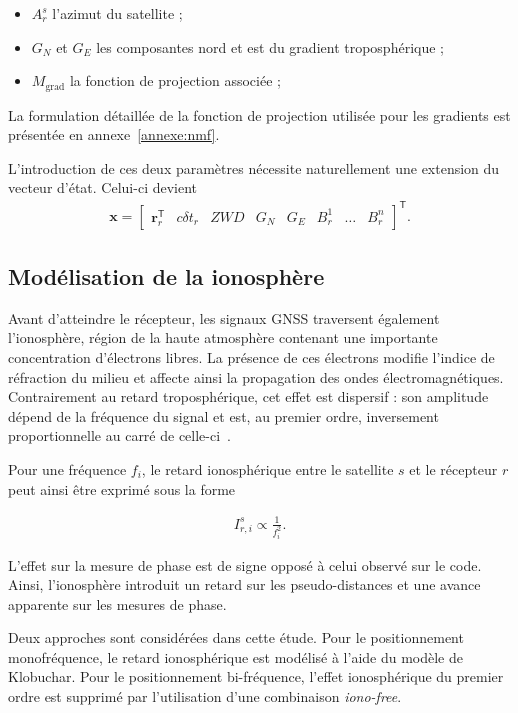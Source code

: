 \begin{itemize}
    \item $A_r^s$ l'azimut du satellite ;
    \item $G_N$ et $G_E$ les composantes nord et est du gradient
    troposphérique ;
    \item $M_{\mathrm{grad}}$ la fonction de projection associée ;
\end{itemize}

La formulation détaillée de la fonction de projection utilisée pour les gradients est
présentée en annexe~\ref{annexe:nmf}.

L'introduction de ces deux paramètres nécessite naturellement une extension
du vecteur d'état. Celui-ci devient
\begin{align}
\mathbf x
=
\begin{bmatrix}
\mathbf r_r^{\mathsf T} & c\delta t_r & ZWD & G_N & G_E &
B_r^1 & \ldots & B_r^n
\end{bmatrix}^{\mathsf T}.
\label{eq:state_zwd_grad}
\end{align}

\subsection{Modélisation de la ionosphère}

Avant d'atteindre le récepteur, les signaux GNSS traversent également
l'ionosphère, région de la haute atmosphère contenant une importante
concentration d'électrons libres. La présence de ces électrons modifie
l'indice de réfraction du milieu et affecte ainsi la propagation des ondes
électromagnétiques. Contrairement au retard troposphérique, cet effet est
dispersif : son amplitude dépend de la fréquence du signal et est, au
premier ordre, inversement proportionnelle au carré de celle-ci~\cite{hauschild2017observations}.

Pour une fréquence $f_i$, le retard ionosphérique entre le satellite $s$ et le
récepteur $r$ peut
ainsi être exprimé sous la forme

\begin{align}
I_{r,i}^s
\propto
\frac{1}{f_i^2}.
\end{align}

L'effet sur la mesure de phase est de signe opposé à celui observé sur le
code. Ainsi, l'ionosphère introduit un retard sur les pseudo-distances et
une avance apparente sur les mesures de phase.

Deux approches sont considérées dans cette étude. Pour le positionnement
monofréquence, le retard ionosphérique est modélisé à l'aide du modèle de
Klobuchar. Pour le positionnement bi-fréquence, l'effet ionosphérique du
premier ordre est supprimé par l'utilisation d'une combinaison
\textit{iono-free}.

